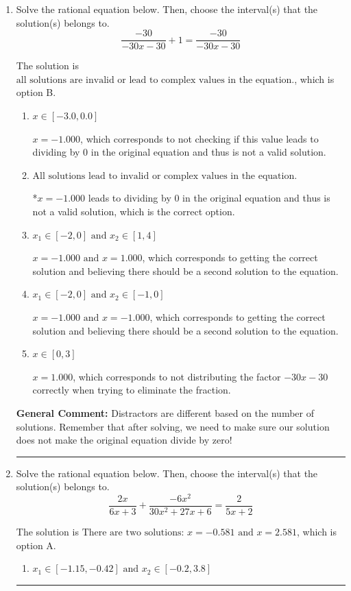 \documentclass{extbook}[14pt]
\newcommand{\litem}[1]{\item #1

\rule{\textwidth}{0.4pt}}
\begin{document}
\begin{enumerate}\litem{
Solve the rational equation below. Then, choose the interval(s) that the solution(s) belongs to.
\[ \frac{-30}{-30x -30} + 1 = \frac{-30}{-30x -30} \]

The solution is \( \text{all solutions are invalid or lead to complex values in the equation.} \), which is option B.\begin{enumerate}[label=\Alph*.]
\item \( x \in [-3.0,0.0] \)

$x = -1.000$, which corresponds to not checking if this value leads to dividing by 0 in the original equation and thus is not a valid solution.
\item \( \text{All solutions lead to invalid or complex values in the equation.} \)

*$x = -1.000$ leads to dividing by 0 in the original equation and thus is not a valid solution, which is the correct option.
\item \( x_1 \in [-2, 0] \text{ and } x_2 \in [1,4] \)

$x = -1.000 \text{ and } x = 1.000$, which corresponds to getting the correct solution and believing there should be a second solution to the equation.
\item \( x_1 \in [-2, 0] \text{ and } x_2 \in [-1,0] \)

$x = -1.000 \text{ and } x = -1.000$, which corresponds to getting the correct solution and believing there should be a second solution to the equation.
\item \( x \in [0,3] \)

$x = 1.000$, which corresponds to not distributing the factor $-30x -30$ correctly when trying to eliminate the fraction.
\end{enumerate}

\textbf{General Comment:} Distractors are different based on the number of solutions. Remember that after solving, we need to make sure our solution does not make the original equation divide by zero!
}
\litem{
Solve the rational equation below. Then, choose the interval(s) that the solution(s) belongs to.
\[ \frac{2x}{6x + 3} + \frac{-6x^{2}}{30x^{2} +27 x + 6} = \frac{2}{5x + 2} \]

The solution is \( \text{There are two solutions: } x = -0.581 \text{ and } x = 2.581 \), which is option A.\begin{enumerate}[label=\Alph*.]
\item \( x_1 \in [-1.15, -0.42] \text{ and } x_2 \in [-0.2,3.8] \)


\end{enumerate}}
\end{enumerate}
\end{document}

